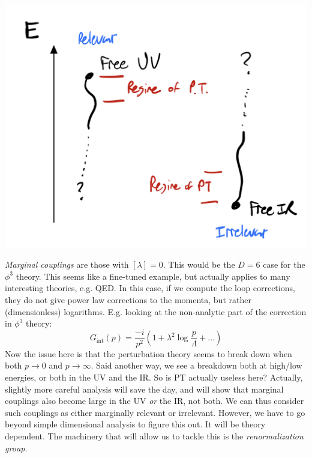 \begin{center}
    \includegraphics[scale=0.4]{Lectures/Figures/lec14-ptvalidity.png}
\end{center}

\emph{Marginal couplings} are those with $[\lambda] = 0$. This would be the $D = 6$ case for the $\phi^3$ theory. This seems like a fine-tuned example, but actually applies to many interesting theories, e.g. QED. In this case, if we compute the loop corrections, they do not give power law corrections to the momenta, but rather (dimensionless) logarithms. E.g. looking at the non-analytic part of the correction in $\phi^3$ theory:
\begin{equation}
    G_{\text{int}}(p) = \frac{-i}{p^2}\left(1 + \lambda^2 \log \frac{p}{\Lambda} + \ldots\right)
\end{equation}
Now the issue here is that the perturbation theory seems to break down when both $p \to 0$ and $p \to \infty$. Said another way, we see a breakdown both at high/low energies, or both in the UV and the IR. So is PT actually useless here? Actually, slightly more careful analysis will save the day, and will show that marginal couplings also become large in the UV \emph{or} the IR, not both. We can thus consider such couplings as either marginally relevant or irrelevant. However, we have to go beyond simple dimensional analysis to figure this out. It will be theory dependent. The machinery that will allow us to tackle this is the \emph{renormalization group}.

